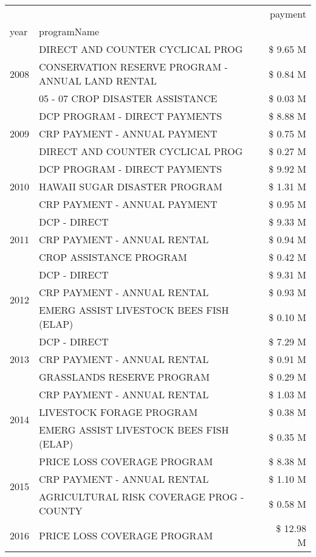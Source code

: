 \begin{tabular}{llr}
\toprule
 &  & payment \\
year & programName &  \\
\midrule
\multirow[t]{3}{*}{2008} & DIRECT AND COUNTER CYCLICAL PROG & \$ 9.65 M \\
 & CONSERVATION RESERVE PROGRAM - ANNUAL LAND RENTAL & \$ 0.84 M \\
 & 05 - 07 CROP DISASTER ASSISTANCE & \$ 0.03 M \\
\cline{1-3}
\multirow[t]{3}{*}{2009} & DCP PROGRAM - DIRECT PAYMENTS & \$ 8.88 M \\
 & CRP PAYMENT - ANNUAL PAYMENT & \$ 0.75 M \\
 & DIRECT AND COUNTER CYCLICAL PROG & \$ 0.27 M \\
\cline{1-3}
\multirow[t]{3}{*}{2010} & DCP PROGRAM - DIRECT PAYMENTS & \$ 9.92 M \\
 & HAWAII SUGAR DISASTER PROGRAM & \$ 1.31 M \\
 & CRP PAYMENT - ANNUAL PAYMENT & \$ 0.95 M \\
\cline{1-3}
\multirow[t]{3}{*}{2011} & DCP - DIRECT & \$ 9.33 M \\
 & CRP PAYMENT - ANNUAL RENTAL & \$ 0.94 M \\
 & CROP ASSISTANCE PROGRAM & \$ 0.42 M \\
\cline{1-3}
\multirow[t]{3}{*}{2012} & DCP - DIRECT & \$ 9.31 M \\
 & CRP PAYMENT - ANNUAL RENTAL & \$ 0.93 M \\
 & EMERG ASSIST LIVESTOCK BEES FISH (ELAP) & \$ 0.10 M \\
\cline{1-3}
\multirow[t]{3}{*}{2013} & DCP - DIRECT & \$ 7.29 M \\
 & CRP PAYMENT - ANNUAL RENTAL & \$ 0.91 M \\
 & GRASSLANDS RESERVE PROGRAM & \$ 0.29 M \\
\cline{1-3}
\multirow[t]{3}{*}{2014} & CRP PAYMENT - ANNUAL RENTAL & \$ 1.03 M \\
 & LIVESTOCK FORAGE PROGRAM & \$ 0.38 M \\
 & EMERG ASSIST LIVESTOCK BEES FISH (ELAP) & \$ 0.35 M \\
\cline{1-3}
\multirow[t]{3}{*}{2015} & PRICE LOSS COVERAGE PROGRAM & \$ 8.38 M \\
 & CRP PAYMENT - ANNUAL RENTAL & \$ 1.10 M \\
 & AGRICULTURAL RISK COVERAGE PROG - COUNTY & \$ 0.58 M \\
\cline{1-3}
\multirow[t]{3}{*}{2016} & PRICE LOSS COVERAGE PROGRAM                   & \$ 12.98 M \\

\end{tabular}
